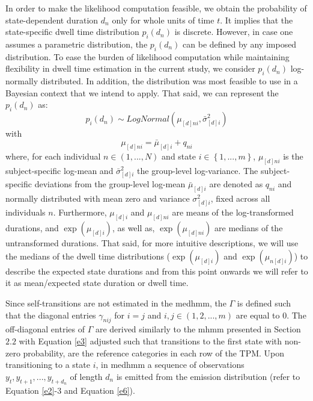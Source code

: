 In order to make the likelihood computation feasible, we obtain the probability of state-dependent duration $d_n$ only for whole units of time $t$. It implies that the state-specific dwell time distribution $p_i(d_n)$ is discrete. However, in case one assumes a parametric distribution, the $p_{i}(d_n)$ can be defined by any imposed distribution. To ease the burden of likelihood computation while maintaining flexibility in dwell time estimation in the current study, we consider $p_{i}(d_n)$ log-normally distributed. In addition, the distribution was most feasible to use in a Bayesian context that we intend to apply. \newpage That said, we can represent the $p_{i}(d_{n})$ as:
\begin{equation}
 p_{i}(d_{n})\sim LogNormal\left ( \mu_{[d]ni}, \bar{\sigma}^2_{[d]i} \right )
\end{equation}
with 
\begin{equation}
\mu_{[d]ni}=\bar{\mu}_{[d]i}+q_{ni}
\end{equation}
where, for each individual ${n\in \left ( 1,..., N\right )}$ and state ${i\in \left \{ 1,..., m \right \}}$, $\mu_{[d]ni}$ is the subject-specific log-mean and $\bar{\sigma}^2_{[d]i}$ the group-level log-variance. The subject-specific deviations from the group-level log-mean $\bar{\mu}_{[d]i}$ are denoted as $q_{ni}$ and normally distributed with mean zero and variance $\sigma^{2}_{[d]i}$, fixed across all individuals $n$. Furthermore, $\mu_{[d]i}$ and $\mu_{[d]ni}$ are means of the log-transformed durations, and $\exp{(\mu_{[d]i})}$, as well as, $\exp{(\mu_{[d]ni})}$ are medians of the untransformed durations. That said, for more intuitive descriptions, we will use the medians of the dwell time distributions ($\exp{(\mu_{[d]i})}$ and $\exp{(\mu_{n[d]i})}$) to describe the expected state durations and from this point onwards we will refer to it as mean/expected state duration or dwell time.

Since self-transitions are not estimated in the \ac{medhmm}, the $\Gamma$ is defined such that the diagonal entries $\gamma_{nij}$ for ${i=j}$ and ${i,j\in(1,2,...,m)}$ are equal to $0$. The off-diagonal entries of $\Gamma$ are derived similarly to the \ac{mhmm} presented in Section $2.2$ with Equation \ref{e3} adjusted such that transitions to the first state with non-zero probability, are the reference categories in each row of the TPM. Upon transitioning to a state $i$, in \ac{medhmm} a sequence of observations ${y_t, y_{t+1},...,y_{t+d_n}}$ of length $d_n$ is emitted from the emission distribution (refer to Equation \ref{e2}-3 and Equation \ref{e6}).


